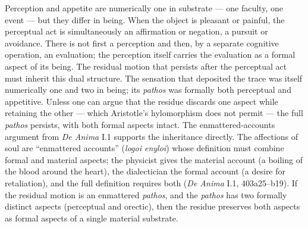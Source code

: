 \documentclass{article}
\begin{document}
Perception and appetite are numerically one in substrate --- one faculty, one event --- but they differ in being. When the object is pleasant or painful, the perceptual act is simultaneously an affirmation or negation, a pursuit or avoidance. There is not first a perception and then, by a separate cognitive operation, an evaluation; the perception itself carries the evaluation as a formal aspect of its being. The residual motion that persists after the perceptual act must inherit this dual structure. The sensation that deposited the trace was itself numerically one and two in being; its \textit{pathos} was formally both perceptual and appetitive. Unless one can argue that the residue discards one aspect while retaining the other --- which Aristotle's hylomorphism does not permit --- the full \textit{pathos} persists, with both formal aspects intact. The enmattered-accounts argument from \textit{De Anima} I.1 supports the inheritance directly. The affections of soul are ``enmattered accounts'' (\textit{logoi enyloi}) whose definition must combine formal and material aspects; the physicist gives the material account (a boiling of the blood around the heart), the dialectician the formal account (a desire for retaliation), and the full definition requires both (\textit{De Anima} I.1, 403a25--b19). If the residual motion is an enmattered \textit{pathos}, and the \textit{pathos} has two formally distinct aspects (perceptual and orectic), then the residue preserves both aspects as formal aspects of a single material substrate.
\end{document}
